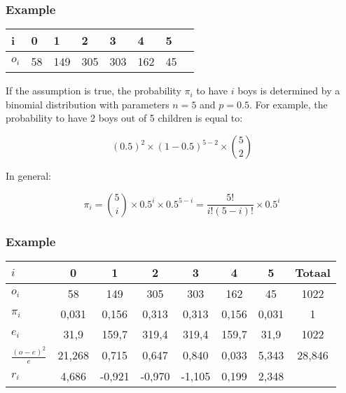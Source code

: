 \documentclass[aspectratio=169]{beamer}
\begin{document}
\begin{frame}
  \frametitle{Example}
  \begin{table}[h]
    \begin{tabular}{@{}llllllll@{}}
      \toprule
      i       & 0  & 1   & 2   & 3   & 4   & 5  &  \\ \midrule
      $o_{i}$ & 58 & 149 & 305 & 303 & 162 & 45 &  \\ \bottomrule
    \end{tabular}
  \end{table}
  \pause
  If the assumption is true, the probability $\pi_{i}$ to have $i$ boys is determined by a binomial distribution with parameters $n=5$ and $p=0.5$.
  For example, the probability to have 2 boys out of 5 children is equal to:
  
  \[ (0.5)^{2} \times (1-0.5)^{5-2} \times \binom{5}{2} \]
  
  In general:
  
  \[ \pi_{i} = \binom{5}{i}\times 0.5^{i} \times 0.5^{5-i} = \frac{5!}{i!(5-i)!}\times 0.5^{i} \]
\end{frame}

\begin{frame}
  \frametitle{Example}
  \centering
  \begin{tabular}{lSSSSSSS}
    \toprule
    $i$                   & 0      & 1      & 2      & 3      & 4     & 5     & Totaal \\
    \midrule
    $o_i$                 & 58     & 149    & 305    & 303    & 162   & 45    & 1022   \\
    $\pi_i$               & 0,031  & 0,156  & 0,313  & 0,313  & 0,156 & 0,031 & 1      \\
    $e_i$                 & 31,9   & 159,7  & 319,4  & 319,4  & 159,7 & 31,9  & 1022   \\
    $\frac{(o-e)^{2}}{e}$ & 21,268 & 0,715  & 0,647  & 0,840  & 0,033 & 5,343 & 28,846 \\
    $r_i$                 & 4,686  & -0,921 & -0,970 & -1,105 & 0,199 & 2,348 &        \\
    \bottomrule
  \end{tabular}
\end{frame}
\end{document}
